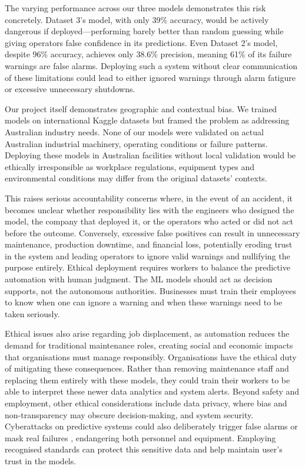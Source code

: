 \documentclass[11pt]{article}
\begin{document}
The varying performance across our three models demonstrates this risk concretely. Dataset 3's model, with only 39\% accuracy, would be actively dangerous if deployed—performing barely better than random guessing while giving operators false confidence in its predictions. Even Dataset 2's model, despite 96\% accuracy, achieves only 38.6\% precision, meaning 61\% of its failure warnings are false alarms. Deploying such a system without clear communication of these limitations could lead to either ignored warnings through alarm fatigure or excessive unnecessary shutdowns.

Our project itself demonstrates geographic and contextual bias. We trained models on international Kaggle datasets but framed the problem as addressing Australian industry needs. None of our models were validated on actual Australian industrial machinery, operating conditions or failure patterns. Deploying these models in Australian facilities without local validation would be ethically irresponsible as workplace regulations, equipment types and environmental conditions may differ from the original datasets’ contexts.

This raises serious accountability concerns where, in the event of an accident, it becomes unclear whether responsibility lies with the engineers who designed the model, the company that deployed it, or the operators who acted or did not act before the outcome. Conversely, excessive false positives can result in unnecessary maintenance, production downtime, and financial loss, potentially eroding trust in the system and leading operators to ignore valid warnings and nullifying the purpose entirely. Ethical deployment requires workers to balance the predictive automation with human judgment. The ML models should act as decision supports, not the autonomous authorities. Businesses must train their employees to know when one can ignore a warning and when these warnings need to be taken seriously.

Ethical issues also arise regarding job displacement, as automation reduces the demand for traditional maintenance roles, creating social and economic impacts that organisations must manage responsibly. Organisations have the ethical duty of mitigating these consequences. Rather than removing maintenance staff and replacing them entirely with these models, they could train their workers to be able to interpret these newer data analytics and system alerts. Beyond safety and employment, other ethical considerations include data privacy, where bias and non-transparency may obscure decision-making, and system security. Cyberattacks on predictive systems could also deliberately trigger false alarms or mask real failures \cite{siddique2023}, endangering both personnel and equipment. Employing recognised standards can protect this sensitive data and help maintain user's trust in the models.
\end{document}

